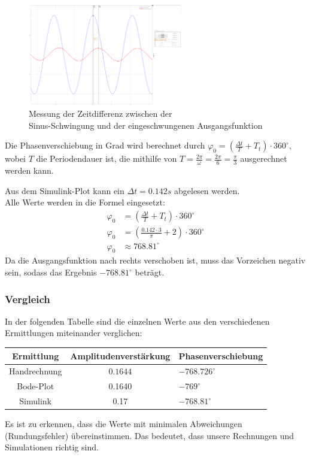 \begin{figure}[H]
    \centering
    \includegraphics[width=0.6\textwidth]{Bilder/SimulinkPhase.png}
    \caption[width=0.6\textwidth]{Messung der Zeitdifferenz zwischen der \\ Sinus-Schwingung und der eingeschwungenen Ausgangsfunktion}
 \end{figure}

Die Phasenverschiebung in Grad wird berechnet durch $\varphi_0 = (\frac{\Delta t}{T} +T_t ) \cdot 360^{\circ}$, wobei $T$ die Periodendauer ist, die mithilfe von $T = \frac{2\pi}{\omega} = \frac{2\pi}{6} = \frac{\pi}{3}$ ausgerechnet werden kann.

Aus dem Simulink-Plot kann ein $\Delta t = 0.142s$ abgelesen werden.\\
Alle Werte werden in die Formel eingesetzt:
\begin{align*}
    \varphi_0 &= (\frac{\Delta t}{T} +T_t ) \cdot 360^{\circ} \\
    \varphi_0 &= (\frac{0.142 \cdot 3}{\pi} +2 ) \cdot 360^{\circ} \\
    \varphi_0 & \approx 768.81^{\circ}
\end{align*}
Da die Ausgangsfunktion nach rechts verschoben ist, muss das Vorzeichen negativ sein, sodass das Ergebnis $-768.81^{\circ}$ beträgt.
\subsubsection{Vergleich}
In der folgenden Tabelle sind die einzelnen Werte aus den verschiedenen Ermittlungen miteinander verglichen:
\renewcommand{\arraystretch}{1.2}
\begin{center}
    \begin{tabular}{ c|c|l } 
    Ermittlung & Amplitudenverstärkung & Phasenverschiebung \\
    \hline
    Handrechnung & $0.1644$ & $-768.726^{\circ}$ \\ 
    Bode-Plot & 0.1640 & $-769^{\circ}$ \\ 
    Simulink & 0.17 & $-768.81^{\circ}$ \\ 
    \end{tabular}
\end{center}
Es ist zu erkennen, dass die Werte mit minimalen Abweichungen (Rundungsfehler) übereinstimmen. Das bedeutet, dass unsere Rechnungen und Simulationen richtig sind. 



